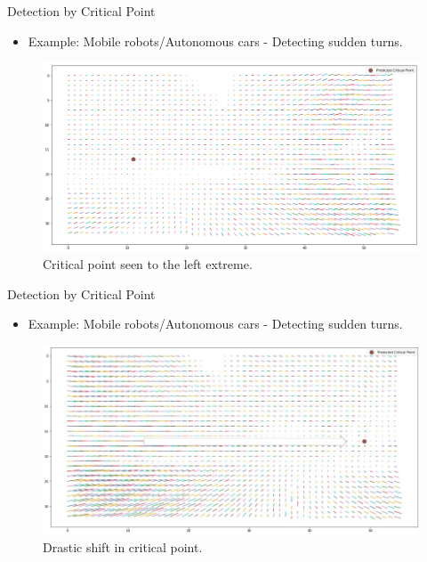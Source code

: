\documentclass{beamer}
\begin{document}
\begin{frame}{Detection by Critical Point}
\begin{itemize}
\item Example: Mobile robots/Autonomous cars - Detecting sudden turns. 
\end{itemize}
\begin{figure}[h]
            	\centering
            	\includegraphics[width =0.65\linewidth]{images/1117critturn1.png} 
            	\caption{Critical point seen to the left extreme.}
            \end{figure}
\end{frame}


\begin{frame}{Detection by Critical Point}
\begin{itemize}
\item Example: Mobile robots/Autonomous cars - Detecting sudden turns. 
\end{itemize}
\begin{figure}[h]
            	\centering
            	\includegraphics[width =0.65\linewidth]{images/49_17_critturn2.png} 
            	\caption{Drastic shift in critical point.}
            \end{figure}
\end{frame}
\end{document}
